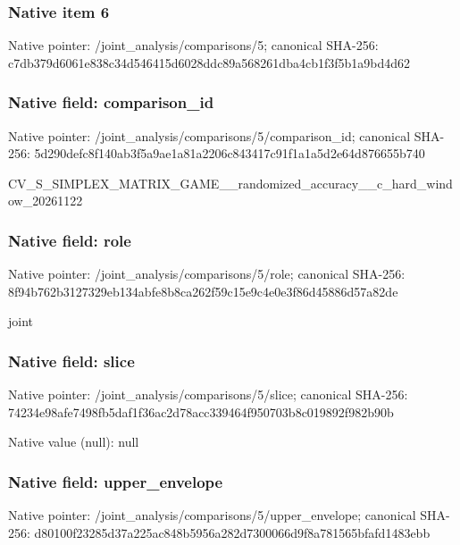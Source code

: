 \documentclass[10pt,a4paper]{article}
\begin{document}
\subsubsection{Native item 6}


Native pointer: /joint\_analysis/comparisons/5; canonical SHA-256: c7db379d6061e838c34d5464\allowbreak{}15d6028ddc89a568261dba4c\allowbreak{}b1f3f5b1a9bd4d62



\subsubsection{Native field: comparison\_id}


Native pointer: /joint\_analysis/comparis\allowbreak{}ons/5/comparison\_id; canonical SHA-256: 5d290defc8f140ab3f5a9ae1\allowbreak{}a81a2206c843417c91f1a1a5\allowbreak{}d2e64d876655b740


CV\_S\_SIMPLEX\_MATRIX\_GAME\allowbreak{}\_\_randomized\_accuracy\_\_c\allowbreak{}\_hard\_window\_20261122


\subsubsection{Native field: role}


Native pointer: /joint\_analysis/comparisons/5/role; canonical SHA-256: 8f94b762b3127329eb134abf\allowbreak{}e8b8ca262f59c15e9c4e0e3f\allowbreak{}86d45886d57a82de


joint


\subsubsection{Native field: slice}


Native pointer: /joint\_analysis/comparisons/5/slice; canonical SHA-256: 74234e98afe7498fb5daf1f3\allowbreak{}6ac2d78acc339464f950703b\allowbreak{}8c019892f982b90b



Native value (null): null



\subsubsection{Native field: upper\_envelope}


Native pointer: /joint\_analysis/comparis\allowbreak{}ons/5/upper\_envelope; canonical SHA-256: d80100f23285d37a225ac848\allowbreak{}b5956a282d7300066d9f8a78\allowbreak{}1565bfafd1483ebb
\end{document}
